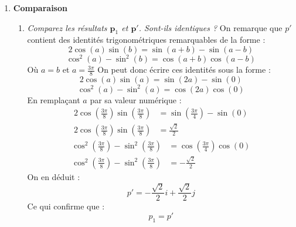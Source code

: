\documentclass[a4paper,12pt]{article}
\begin{document}
\begin{enumerate}
    \item \textbf{Comparaison}
          \begin{enumerate}
              \item \emph{Comparez les résultats $\mathbf{p}_1$ et $\mathbf{p}'$. Sont-ils identiques ?} \newline \newline
              On remarque que $p'$ contient des identités trigonométriques remarquables de la forme :
               \begin{equation}
              2 \cos(a) \sin (b) = \sin(a + b) - \sin(a - b)
              \end{equation}
              \begin{equation}
              \cos^2(a) - \sin^2(b) = \cos(a + b) \cos(a - b)
              \end{equation}
              Où \(a = b \) et \(a = \frac{3 \pi}{8} \) \newline 
              On peut donc écrire ces identités sous la forme :
              \begin{equation}
              2 \cos(a) \sin (a) = \sin(2a) - \sin(0)
              \end{equation}
              \begin{equation}
              \cos^2(a) - \sin^2(a) = \cos(2a) \cos(0)
              \end{equation}
              En remplaçant $a$ par sa valeur numérique : 
              \begin{align}
              2 \cos(\frac{3 \pi}{8}) \sin (\frac{3 \pi}{8}) &= \sin(\frac{3 \pi}{4}) - \sin(0) \\
              2 \cos(\frac{3 \pi}{8}) \sin (\frac{3 \pi}{8}) &= \frac{\sqrt{2}}{2}
              \end{align}
              \begin{align}
              \cos^2(\frac{3 \pi}{8}) - \sin^2(\frac{3 \pi}{8}) &= \cos(\frac{3 \pi}{4}) \cos(0) \\
              \cos^2(\frac{3 \pi}{8}) - \sin^2(\frac{3 \pi}{8}) &= -\frac{\sqrt{2}}{2}
              \end{align}
              On en déduit :
              \begin{equation}
                \boxed{p' = -\frac{\sqrt{2}}{2} i + \frac{\sqrt{2}}{2} j}
              \end{equation}
              Ce qui confirme que :
              \begin{equation}
                \boxed{p_1 = p'}

\end{equation}
\end{enumerate}
\end{enumerate}
\end{document}

